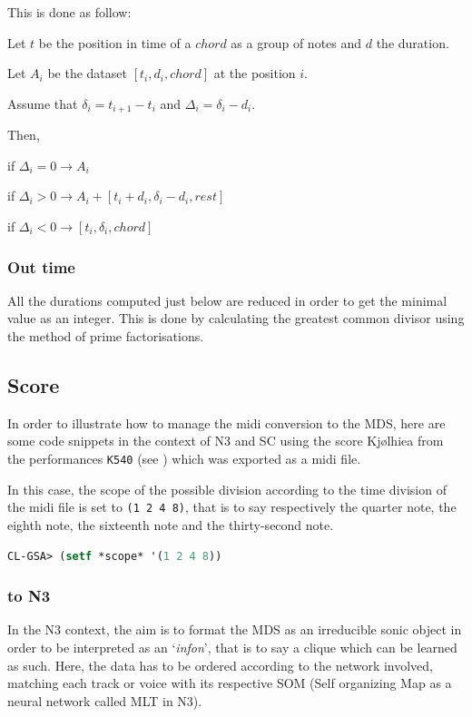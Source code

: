 This is done as follow:

\noindent Let $t$ be the position in time of a $chord$ as a group of notes and $d$ the duration.

\noindent Let $A_i$ be the dataset $[ t_i, d_i, chord ]$ at the position $i$.

\noindent Assume that $\delta_i = t_{i+1} - t_i$ and $\Delta_i = \delta_i - d_i$.

\noindent Then,

if $\Delta_i = 0 \rightarrow A_i$

if $\Delta_i > 0 \rightarrow A_i + [ t_i + d_i, \delta_i - d_i, rest ]$

if $\Delta_i < 0 \rightarrow [ t_i, \delta_i, chord ]$

\subsubsection{Out time}

All the durations computed just below are reduced in order to get the minimal value as an integer. This is done by calculating the greatest common divisor using the method of prime factorisations.

\subsection{Score}
\label{score}

In order to illustrate how to manage the midi conversion to the MDS, here are some code snippets in the context of N3 and SC using the score Kj{\o}lhiea from the performances \texttt{K540} (see ) which was exported as a midi file.

\smallskip

In this case, the scope of the possible division according to the time division of the midi file is set to \texttt{(1 2 4 8)}, that is to say respectively the quarter note, the eighth note, the sixteenth note and the thirty-second note.

\begin{lstlisting}[language=Lisp]
CL-GSA> (setf *scope* '(1 2 4 8))
\end{lstlisting}

\subsubsection{to N3}

In the N3 context, the aim is to format the MDS as an irreducible sonic object in order to be interpreted as an `\textit{infon}', that is to say a clique which can be learned as such. Here, the data has to be ordered according to the network involved, matching each track or voice with its respective SOM (Self organizing Map as a neural network called MLT in N3). 

